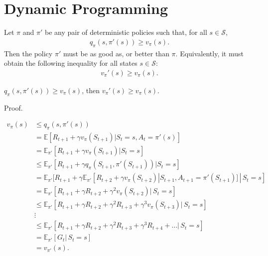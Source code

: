 \chapter{Dynamic Programming}

Let $\pi$ and $\pi'$ be any pair of deterministic policies such that, for all $s\in \mathcal{S}$, 
\begin{align*}
	q_\pi(s, \pi'(s))\geq v_\pi(s).	
\end{align*}
Then the policy $\pi'$ must be as good as, or better than $\pi$. Equivalently, it must obtain the following inequality for all states $s\in \mathcal{S}$:
\begin{align*}
	v_\pi'(s)\geq v_\pi(s).	
\end{align*}

\begin{theorem}
	$q_\pi(s, \pi'(s))\geq v_\pi(s)$, then $v_\pi'(s)\geq v_\pi(s)$.	
\end{theorem}
Proof.

\begin{align*}
	v_\pi(s)&\leq q_\pi(s, \pi'(s))	\\
	&= \mathbb{E}[R_{t+1}+\gamma v_\pi(S_{t+1})|S_t=s, A_t=\pi'(s)]\\
	&= \mathbb{E}_{\pi'}[R_{t+1}+\gamma v_\pi(S_{t+1})|S_t=s]\\
	&\leq \mathbb{E}_{\pi'}[R_{t+1}+\gamma q_\pi(S_{t+1}, \pi'(S_{t+1}))|S_t=s]\\
	&= \mathbb{E}_{\pi'}[R_{t+1}+\gamma \mathbb{E}_{\pi'}[R_{t+2}+\gamma v_\pi(S_{t+2})|S_{t+1}, A_{t+1}=\pi'(S_{t+1})]\,|\,S_t=s]\\
	&= \mathbb{E}_{\pi'}[R_{t+1}+\gamma R_{t+2}+\gamma^2 v_\pi(S_{t+2})|\,S_t=s]\\
	&\leq \mathbb{E}_{\pi'}[R_{t+1}+\gamma R_{t+2}+\gamma^2 R_{t+3}+\gamma^3 v_\pi(S_{t+3})|\,S_t=s]\\
	&\vdots\\
	&\leq \mathbb{E}_{\pi'}[R_{t+1}+\gamma R_{t+2}+\gamma^2 R_{t+3}+\gamma^3 R_{t+4}+\ldots|\,S_t=s]\\
	&= \mathbb{E}_{\pi'}[G_t|\,S_t=s]\\
	&= v_{\pi'}(s).
\end{align*}


